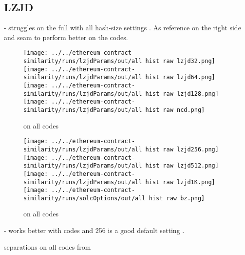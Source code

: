\documentclass[../main.tex]{subfiles}
\begin{document}
\subsection{LZJD}

\hyp{
   struggles on the full  with all hash-size settings  . As reference on the right side  and  seam to perform better on the  codes.
}

\begin{figure}[ht!]
  \centering
  \texttt{[image: ../../ethereum-contract-similarity/runs/lzjdParams/out/all hist raw lzjd32.png]}%
  \texttt{[image: ../../ethereum-contract-similarity/runs/lzjdParams/out/all hist raw lzjd64.png]}%
  \texttt{[image: ../../ethereum-contract-similarity/runs/lzjdParams/out/all hist raw lzjd128.png]}%
  \texttt{[image: ../../ethereum-contract-similarity/runs/lzjdParams/out/all hist raw ncd.png]}%
  \caption{ on all   codes}
  \label{fig:solc_lzjd1}
\end{figure}

\begin{figure}[ht!]
  \centering
  \texttt{[image: ../../ethereum-contract-similarity/runs/lzjdParams/out/all hist raw lzjd256.png]}%
  \texttt{[image: ../../ethereum-contract-similarity/runs/lzjdParams/out/all hist raw lzjd512.png]}%
  \texttt{[image: ../../ethereum-contract-similarity/runs/lzjdParams/out/all hist raw lzjd1K.png]}%
  \texttt{[image: ../../ethereum-contract-similarity/runs/solcOptions/out/all hist raw bz.png]}%
  \caption{ on all   codes}
  \label{fig:solc_lzjd2}
\end{figure}

\hyp{
   works better with  codes and 256 is a good default  setting   .
}

\begin{table}[ht!]
  \centering
  \scriptsize %
  \caption{ separations on all codes from }
  \label{tbl:lz_solc_sep}
\end{table}
\end{document}
